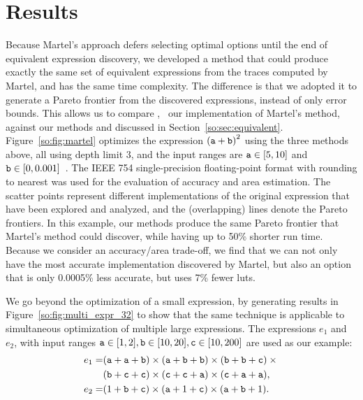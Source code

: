 \section{Results}
\label{so:sec:results}

Because Martel's approach defers selecting optimal options until the end of
equivalent expression discovery, we developed a method that could produce
exactly the same set of equivalent expressions from the traces computed by
Martel, and has the same time complexity. The difference is that we adopted it
to generate a Pareto frontier from the discovered expressions, instead of only
error bounds.  This allows us to compare \marteltrace{}, \ie~our implementation
of Martel's method, against our methods \frontiertrace{} and \greedytrace{}
discussed in Section~\ref{so:sec:equivalent}.  Figure~\ref{so:fig:martel}
optimizes the expression ${(\texttt{a} + \texttt{b})}^2$ using the three methods above,
all using depth limit $3$, and the input ranges are $\texttt{a} \in [5, 10]$
and $\texttt{b} \in [0, 0.001]$~\cite{martel07}. The IEEE 754 single-precision
floating-point format with rounding to nearest was used for the evaluation
of accuracy and area estimation. The scatter points represent different
implementations of the original expression that have been explored and
analyzed, and the (overlapping) lines denote the Pareto frontiers. In this
example, our methods produce the same Pareto frontier that Martel's method
could discover, while having up to 50\% shorter run time. Because we consider
an accuracy/area trade-off, we find that we can not only have the most accurate
implementation discovered by Martel, but also an option that is only 0.0005\%
less accurate, but uses 7\% fewer \glspl{lut}.

We go beyond the optimization of a small expression, by generating results in
Figure~\ref{so:fig:multi_expr_32} to show that the same technique is applicable
to simultaneous optimization of multiple large expressions. The expressions
$e_1$ and $e_2$, with input ranges $\texttt{a} \in [1, 2], \texttt{b} \in [10, 20], \texttt{c}
\in [10, 200]$ are used as our example:
\begin{equation}
    \begin{aligned}
    e_1 =&
        (\texttt{a} + \texttt{a} + \texttt{b}) \times
        (\texttt{a} + \texttt{b} + \texttt{b}) \times
        (\texttt{b} + \texttt{b} + \texttt{c}) \times {} \\
        &
        (\texttt{b} + \texttt{c} + \texttt{c}) \times
        (\texttt{c} + \texttt{c} + \texttt{a}) \times
        (\texttt{c} + \texttt{a} + \texttt{a}), \\
    e_2 =&
        (1 + \texttt{b} + \texttt{c}) \times
        (\texttt{a} + 1 + \texttt{c}) \times
        (\texttt{a} + \texttt{b} + 1).
    \end{aligned}
\end{equation}

